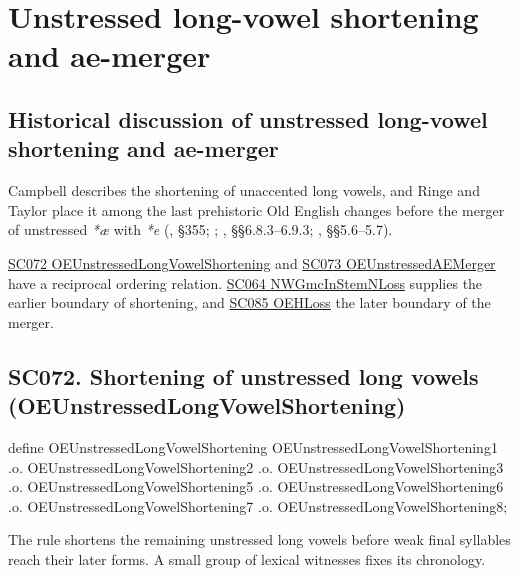 \documentclass[
  british,
  a4paper,
  openany]{book}
\providecommand{\texorpdfstring}[2]{#1}
\DeclareRobustCommand{\CAPRRuleHeading}[2]{%
  #1\texorpdfstring{\\(#2)}{ (#2)}%
}
\begin{document}
\newpage

\section{Unstressed long-vowel shortening and
ae-merger}\label{unstressed-long-vowel-shortening-and-ae-merger}

\subsection{Historical discussion of unstressed long-vowel shortening
and
ae-merger}\label{historical-discussion-of-unstressed-long-vowel-shortening-and-ae-merger}

Campbell describes the shortening of unaccented long vowels, and Ringe
and Taylor place it among the last prehistoric Old English changes
before the merger of unstressed \emph{*æ} with \emph{*e}
(, §355;
;
,
§§6.8.3--6.9.3; , §§5.6--5.7).

\hyperref[rule-OEUnstressedLongVowelShortening]{SC072
OEUnstressedLongVowelShortening} and
\hyperref[rule-OEUnstressedAEMerger]{SC073 OEUnstressedAEMerger} have a
reciprocal ordering relation. \hyperref[rule-NWGmcInStemNLoss]{SC064
NWGmcInStemNLoss} supplies the earlier boundary of shortening, and
\hyperref[rule-OEHLoss]{SC085 OEHLoss} the later boundary of the merger.

\subsection{\texorpdfstring{\CAPRRuleHeading{SC072. Shortening of unstressed long vowels}{OEUnstressedLongVowelShortening}}{}}\label{rule-OEUnstressedLongVowelShortening}

\begin{ReaderFacingFoma}
define OEUnstressedLongVowelShortening OEUnstressedLongVowelShortening1
    .o. OEUnstressedLongVowelShortening2
    .o. OEUnstressedLongVowelShortening3
    .o. OEUnstressedLongVowelShortening5
    .o. OEUnstressedLongVowelShortening6
    .o. OEUnstressedLongVowelShortening7
    .o. OEUnstressedLongVowelShortening8;
\end{ReaderFacingFoma}

The rule shortens the remaining unstressed long vowels before weak final
syllables reach their later forms. A small group of lexical witnesses
fixes its chronology.
\end{document}
